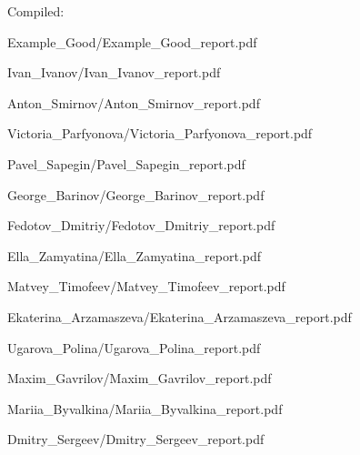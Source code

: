 \documentclass[a4paper]{article}
\begin{document}
Compiled: \DTMnow
\tableofcontents

\clearpage

{Example_Good/Example_Good_report.pdf}

{Ivan_Ivanov/Ivan_Ivanov_report.pdf}

{Anton_Smirnov/Anton_Smirnov_report.pdf}

{Victoria_Parfyonova/Victoria_Parfyonova_report.pdf}

{Pavel_Sapegin/Pavel_Sapegin_report.pdf}

{George_Barinov/George_Barinov_report.pdf}

{Fedotov_Dmitriy/Fedotov_Dmitriy_report.pdf}

{Ella_Zamyatina/Ella_Zamyatina_report.pdf}

{Matvey_Timofeev/Matvey_Timofeev_report.pdf}

{Ekaterina_Arzamaszeva/Ekaterina_Arzamaszeva_report.pdf}

{Ugarova_Polina/Ugarova_Polina_report.pdf}

{Maxim_Gavrilov/Maxim_Gavrilov_report.pdf}

{Mariia_Byvalkina/Mariia_Byvalkina_report.pdf}

{Dmitry_Sergeev/Dmitry_Sergeev_report.pdf}
\end{document}

